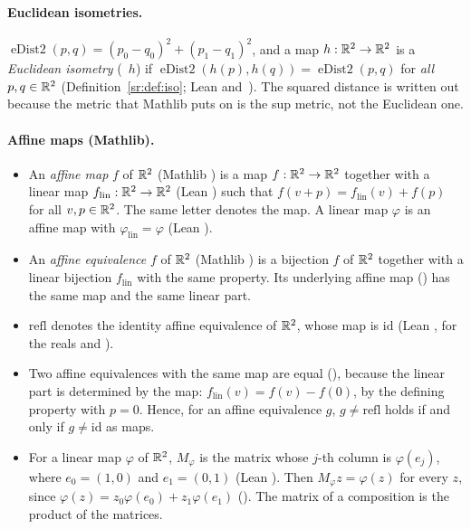 \paragraph{Euclidean isometries.}
$\operatorname{eDist2}(p,q)=(p_0-q_0)^2+(p_1-q_1)^2$, and a map $h:\mathbb R^2\to\mathbb R^2$ is a \emph{Euclidean isometry}
(~$h$) if $\operatorname{eDist2}(h(p),h(q))=\operatorname{eDist2}(p,q)$ for \emph{all}
$p,q\in\mathbb R^2$ (Definition~\ref{sr:def:iso}; Lean  and~). The squared
distance is written out because the metric that Mathlib puts on  is the sup metric, not the Euclidean
one.

\paragraph{Affine maps (Mathlib).}
\begin{itemize}
\item An \emph{affine map} $f$ of $\mathbb R^2$ (Mathlib ) is a map $f:\mathbb R^2\to\mathbb R^2$ together with a linear
map $f_{\mathrm{lin}}:\mathbb R^2\to\mathbb R^2$ (Lean ) such that $f(v+p)=f_{\mathrm{lin}}(v)+f(p)$ for all
$v,p\in\mathbb R^2$. The same letter denotes the map. A linear map $\varphi$ is an affine map with
$\varphi_{\mathrm{lin}}=\varphi$ (Lean ).
\item An \emph{affine equivalence} $f$ of $\mathbb R^2$ (Mathlib ) is a bijection $f$ of $\mathbb R^2$ together
with a linear bijection $f_{\mathrm{lin}}$ with the same property. Its underlying affine map
() has the same map and the same linear part.
\item $\mathrm{refl}$ denotes the identity affine equivalence of $\mathbb R^2$, whose map is $\mathrm{id}$ (Lean
, for the reals and ).
\item Two affine equivalences with the same map are equal (), because the linear part is
determined by the map: $f_{\mathrm{lin}}(v)=f(v)-f(0)$, by the defining property with $p=0$. Hence, for an affine
equivalence $g$, $g\ne\mathrm{refl}$ holds if and only if $g\ne\mathrm{id}$ as maps.
\item For a linear map $\varphi$ of $\mathbb R^2$, $M_\varphi$ is the matrix whose $j$-th column is $\varphi(e_j)$, where
$e_0=(1,0)$ and $e_1=(0,1)$ (Lean ). Then $M_\varphi z=\varphi(z)$ for every $z$, since
$\varphi(z)=z_0\varphi(e_0)+z_1\varphi(e_1)$ (). The matrix of a composition is the
product of the matrices.
\end{itemize}

